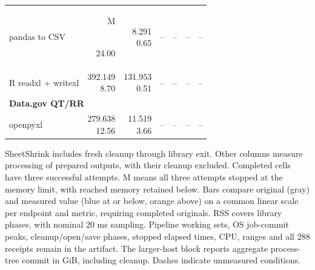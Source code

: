 \begin{table}[p]
\begin{tabular}{lrrrrrr}
pandas to CSV & \shortstack[r]{\colorbox{caseadverse}{\strut M}\\24.00} & \shortstack[r]{8.291\\0.65} & -- & -- & -- & -- \\
R readxl + writexl & \shortstack[r]{392.149\\8.70} & \shortstack[r]{131.953\\0.51} & -- & -- & -- & -- \\
\hline
\multicolumn{7}{l}{\textbf{Data.gov QT/RR}} \\
openpyxl & \shortstack[r]{279.638\\12.56} & \shortstack[r]{11.519\\3.66} & -- & -- & -- & -- \\
\hline
\end{tabular}
\par\smallskip
\begin{minipage}{0.98\textwidth}\footnotesize SheetShrink includes fresh cleanup through library exit. Other columns measure processing of prepared outputs, with their cleanup excluded. Completed cells have three successful attempts. M means all three attempts stopped at the memory limit, with reached memory retained below. Bars compare original (gray) and measured value (blue at or below, orange above) on a common linear scale per endpoint and metric, requiring completed originals. RSS covers library phases, with nominal 20 ms sampling. Pipeline working sets, OS job-commit peaks, cleanup/open/save phases, stopped elapsed times, CPU, ranges and all 288 receipts remain in the artifact. The larger-host block reports aggregate process-tree commit in GiB, including cleanup. Dashes indicate unmeasured conditions.\end{minipage}
\end{table}
